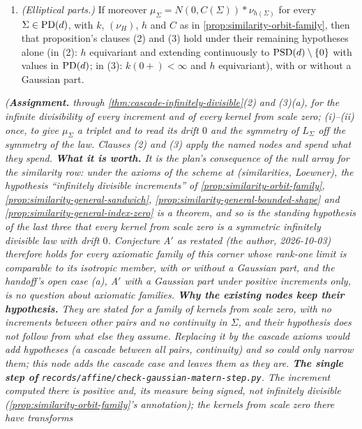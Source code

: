 \begin{proposition}
\begin{enumerate}
\begin{itemize}
\end{itemize}
\item \emph{(Elliptical parts.)} If moreover $\mu_\Sigma = N(0, C(\Sigma)) * \nu_{h(\Sigma)}$ for every
$\Sigma \in \mathrm{PD}(d)$, with $k$, $(\nu_H)$, $h$ and $C$ as in \ref{prop:similarity-orbit-family}, then that
proposition's clauses (2) and (3) hold under their remaining hypotheses alone (in (2): $h$ equivariant and
extending continuously to $\mathrm{PSD}(d) \setminus \{0\}$ with values in $\mathrm{PD}(d)$; in (3): $k(0{+}) < \infty$
and $h$ equivariant), with or without a Gaussian part.
\end{enumerate}
\statusA\quad{}\quad{}\quad\emph{(\textbf{Assignment.}  through
\ref{thm:cascade-infinitely-divisible}(2) and (3)(a), for the infinite divisibility of every increment
and of every kernel from scale zero; (i)--(ii) once, to give $\mu_\Sigma$ a triplet and to
read its drift $0$ and the symmetry of $L_\Sigma$ off the symmetry of the law. Clauses (2) and (3) apply
the named nodes and spend what they spend. \textbf{What it is worth.} It is the plan's consequence of
the null array for the similarity row: under the axioms of the scheme at (similarities, Loewner), the
hypothesis ``infinitely divisible increments'' of
\ref{prop:similarity-orbit-family}, \ref{prop:similarity-general-sandwich},
\ref{prop:similarity-general-bounded-shape} and \ref{prop:similarity-general-index-zero} is a theorem,
and so is the standing hypothesis of the last three that every kernel from scale zero is a symmetric
infinitely divisible law with drift $0$. Conjecture A$'$ as restated (the author, 2026-10-03) therefore
holds for every axiomatic family of this corner whose rank-one limit is comparable to its isotropic
member, with or without a Gaussian part, and the handoff's open case (a), A$'$ with a Gaussian part
under positive increments only, is no question about axiomatic families. \textbf{Why the existing
nodes keep their hypothesis.} They are stated for a family of kernels from scale zero, with no
increments between other pairs and no continuity in $\Sigma$, and their hypothesis does not follow from
what else they assume. Replacing it by the cascade axioms would add hypotheses (a cascade between all
pairs, continuity) and so could only narrow them; this node adds the cascade case and leaves them as
they are. \textbf{The single step of} \texttt{records/affine/check-gaussian-matern-step.py}. The
increment computed there is positive and, its \Levy{} measure being signed, not infinitely divisible
(\ref{prop:similarity-orbit-family}'s annotation); the kernels from scale zero there have transforms
}
\end{proposition}
